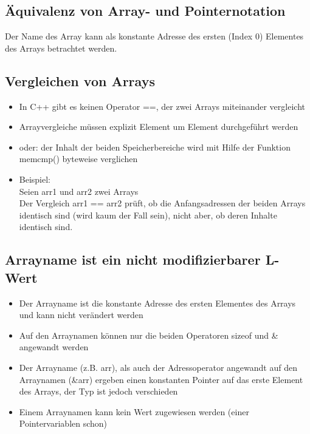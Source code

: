 \subsection{Äquivalenz von Array- und Pointernotation}
\label{sec:Aequivalenz von Array- und Pointernotation}
Der Name des Array kann als konstante Adresse des ersten (Index 0) Elementes des Arrays betrachtet werden.\\
\vspace{5mm}
\begin{figure}[h]
	\centering
	
\end{figure}

\subsection{Vergleichen von Arrays}
\label{sec:Vergleichen von Arrays}
\begin{itemize}
	\item\color{red}In C++ gibt es keinen Operator ==, der zwei Arrays miteinander vergleicht\color{black}
	\item Arrayvergleiche müssen explizit Element um Element durchgeführt werden
	\item oder: der Inhalt der beiden Speicherbereiche wird mit Hilfe der Funktion memcmp() byteweise verglichen
	\item Beispiel:\\Seien arr1 und arr2 zwei Arrays\\Der Vergleich arr1 == arr2 prüft, ob die Anfangsadressen der beiden Arrays identisch sind (wird kaum der Fall sein), nicht aber, ob deren Inhalte identisch sind.
\end{itemize}
	
\subsection{Arrayname ist ein nicht modifizierbarer L-Wert}
\label{sec:Arrayname ist ein nicht modifizierbarer L-Wert}
\begin{itemize}
	\item Der Arrayname ist die konstante Adresse des ersten Elementes des Arrays und kann nicht verändert werden
	\item Auf den Arraynamen können nur die beiden Operatoren sizeof und \& angewandt werden
	\item Der Arrayname (z.B. arr), als auch der Adressoperator angewandt auf den Arraynamen (\&arr) ergeben einen konstanten Pointer auf das erste Element des Arrays, der Typ ist jedoch verschieden
	\item Einem Arraynamen kann kein Wert zugewiesen werden (einer Pointervariablen schon)
\end{itemize}

